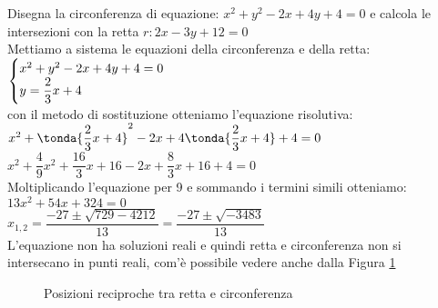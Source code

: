 \begin{esempio}
Disegna la circonferenza di equazione: \(x^2 +y^2 -2x +4y +4 = 0\) e
calcola le intersezioni con la retta \(r:2x-3y+12 = 0\)
\\[7pt]
Mettiamo a sistema le equazioni della circonferenza e della retta: \\[3pt]
\(\begin{cases}x^2 +y^2 -2x +4y +4 = 0 \\ y = \dfrac{2}{3}x+4\end{cases}\) 
\\[7pt]
con il metodo di sostituzione otteniamo l'equazione risolutiva: \\[3pt]
\(x^2 +\tonda{\dfrac{2}{3}x+4}^2 -2x +4\tonda{\dfrac{2}{3}x+4}+4 = 0\) \\[3pt]
\(x^2 +\dfrac{4}{9}x^2+\dfrac{16}{3}x+16-2x+\dfrac{8}{3}x+16+4 = 0\) 
\\[4pt]
Moltiplicando l'equazione per 9 e sommando i termini simili otteniamo:\\[3pt]
\(13x^2+54x+324=0\) \\[4pt]
\(x_{1,2} = \dfrac{-27 \pm \sqrt{729 -4212}}{13} = 
            \dfrac{-27 \pm \sqrt{-3483}}{13}\) 
\\[4pt]
L'equazione non ha soluzioni reali e quindi retta e circonferenza non si 
intersecano in punti reali, com'è possibile vedere anche dalla Figura \ref{fig:circ_circrette}
\end{esempio}

\begin{figure}
\begin{center}
\begin{inaccessibleblock}
  \circrette
  \caption{Posizioni reciproche tra retta e circonferenza}
  \label{fig:circ_circrette}
\end{inaccessibleblock}
\end{center}
\end{figure}

